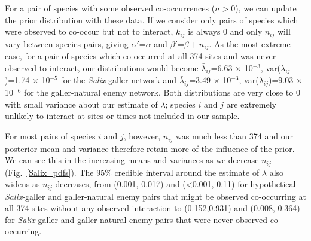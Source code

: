 \documentclass[12pt]{article}
\begin{document}
\begin{spacing}{2.0}
      For a pair of species with some observed co-occurrences ($n>0$), we can update the prior distribution with these data. If we consider only pairs of species which were observed to co-occur but not to interact, $k_{ij}$ is always 0 and only $n_{ij}$ will vary between species pairs, giving $\alpha'$=$\alpha$ and $\beta'$=$\beta + n_{ij}$. As the most extreme case, for a pair of species which co-occurred at all 374 sites and was never observed to interact, our distributions would become 
      $\bar\lambda_{ij}$=6.63 $\times$ 10$^{-3}$, var($\lambda_{ij}$)=1.74 $\times$ 10$^{-5}$ for the \emph{Salix}-galler network and 
      $\bar\lambda_{ij}$=3.49 $\times$ 10$^{-3}$, var($\lambda_{ij}$)=9.03 $\times$ 10$^{-6}$ for the galler-natural enemy network. Both distributions are very close to 0 with small variance about our estimate of $\lambda$; species $i$ and $j$ are extremely unlikely to interact at sites or times not included in our sample.


      For most pairs of species $i$ and $j$, however, $n_{ij}$ was much less than 374 and our posterior mean and variance therefore retain more of the influence of the prior. We can see this in the increasing means and variances as we decrease $n_{ij}$ (Fig.~\ref{Salix_pdfs}). The 95\% credible interval around the estimate of $\lambda$ also widens as $n_{ij}$ decreases, from (0.001, 0.017) and (\textless0.001, 0.11) for hypothetical \emph{Salix}-galler and galler-natural enemy pairs that might be observed co-occurring at all 374 sites without any observed interaction to (0.152,0.931) and (0.008, 0.364) for \emph{Salix}-galler and galler-natural enemy pairs that were never observed co-occurring.





\end{spacing}
\end{document}
